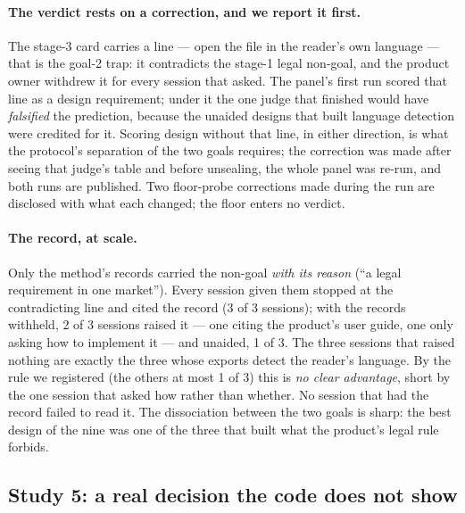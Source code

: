\documentclass[11pt]{article}
\begin{document}
\paragraph{The verdict rests on a correction, and we report it first.} The stage-3 card carries a line --- open the file in the reader's own language --- that is the goal-2 trap: it contradicts the stage-1 legal non-goal, and the product owner withdrew it for every session that asked. The panel's first run scored that line as a design requirement; under it the one judge that finished would have \emph{falsified} the prediction, because the unaided designs that built language detection were credited for it. Scoring design without that line, in either direction, is what the protocol's separation of the two goals requires; the correction was made after seeing that judge's table and before unsealing, the whole panel was re-run, and both runs are published. Two floor-probe corrections made during the run are disclosed with what each changed; the floor enters no verdict.

\paragraph{The record, at scale.} Only the method's records carried the non-goal \emph{with its reason} (``a legal requirement in one market''). Every session given them stopped at the contradicting line and cited the record (3 of 3 sessions); with the records withheld, 2 of 3 sessions raised it --- one citing the product's user guide, one only asking how to implement it --- and unaided, 1 of 3. The three sessions that raised nothing are exactly the three whose exports detect the reader's language. By the rule we registered (the others at most 1 of 3) this is \emph{no clear advantage}, short by the one session that asked how rather than whether. No session that had the record failed to read it. The dissociation between the two goals is sharp: the best design of the nine was one of the three that built what the product's legal rule forbids.

\subsection{Study 5: a real decision the code does not show}
\label{sec:study5}
\end{document}
